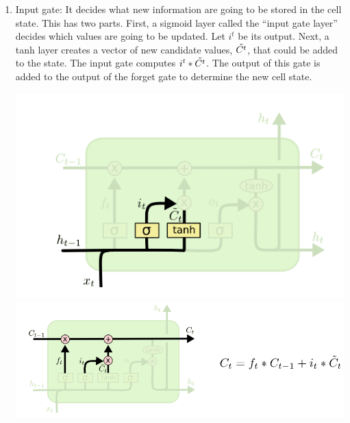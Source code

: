 \begin{enumerate}
    \item Input gate: It decides what new information are going to be stored in the cell state. This has two parts. First, a sigmoid layer called the “input gate layer” decides which values are going to be updated. Let $i^t$ be its output. Next, a tanh layer creates a vector of new candidate values, $\Tilde{C^t}$, that could be added to the state. The input gate computes $i^t * \Tilde{C^t}$. The output of this gate is added to the output of the forget gate to determine the new cell state.
    \begin{center}
        \includegraphics[]{images/Input-gate.png}
        \includegraphics[scale=0.9]{images/new cell-state.png}
    \end{center}
    

\end{enumerate}
